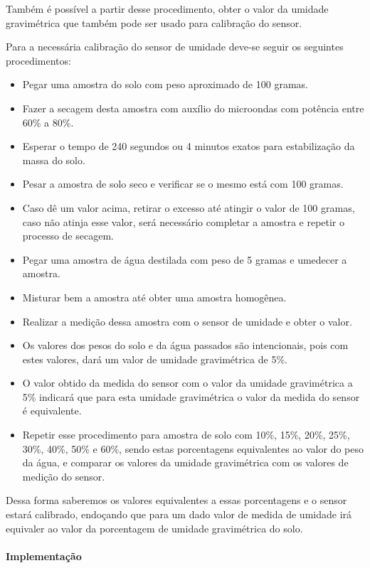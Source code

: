 		Também é possível a partir desse procedimento, obter o valor da umidade gravimétrica
		que também pode ser usado para calibração do sensor.

		Para a necessária calibração do sensor de umidade deve-se seguir os seguintes procedimentos:

		\begin{itemize}
			\item Pegar uma amostra do solo com peso aproximado de 100 gramas.
			\item Fazer a secagem desta amostra com auxílio do microondas com potência entre 60\% a 80\%.
			\item Esperar o tempo de 240 segundos ou 4 minutos exatos para estabilização da massa do solo.
			\item Pesar a amostra de solo seco e verificar se o mesmo está com 100 gramas.
			\item Caso dê um valor acima, retirar o excesso até atingir o valor de 100 gramas,
				caso não atinja esse valor, será necessário completar a amostra e repetir o processo de secagem.
			\item Pegar uma amostra de água destilada com peso de 5 gramas e umedecer a amostra.
			\item Misturar bem a amostra até obter uma amostra homogênea.
			\item Realizar a medição dessa amostra com o sensor de umidade e obter o valor.
			\item Os valores dos pesos do solo e da água passados são intencionais, pois com
				estes valores, dará um valor de umidade gravimétrica de 5\%.
			\item O valor obtido da medida do sensor com o valor da umidade gravimétrica a
				5\% indicará que para esta umidade gravimétrica o valor da medida do sensor é equivalente.
			\item Repetir esse procedimento para amostra de solo com 10\%, 15\%, 20\%, 25\%,
				30\%, 40\%, 50\% e 60\%, sendo estas porcentagens equivalentes ao valor do peso
				da água, e comparar os valores da umidade gravimétrica com os valores de medição do sensor.
		\end{itemize}

		Dessa forma saberemos os valores equivalentes a essas porcentagens e o sensor
		estará calibrado, endoçando que para um dado valor de medida de umidade irá
		equivaler ao valor da porcentagem de umidade gravimétrica do solo.

		\paragraph{Implementação}

